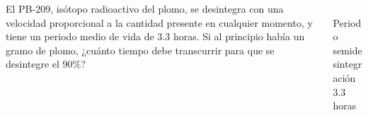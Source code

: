 \documentclass[aspectratio=149,10pt,xcolor=dvipsnames,t]{beamer}
\begin{document}
\begin{frame}
\begin{columns}
\begin{column}[T]{0.75\textwidth}
El PB-209, isótopo radioactivo del plomo, se desintegra con una velocidad proporcional a la cantidad presente en cualquier
momento, y tiene un periodo medio de vida de $3.3$ horas. 
Si al principio había un gramo de plomo, ¿cuánto tiempo debe transcurrir para que se desintegre el $90\%$?
\end{column}
\begin{column}[T]{0.25\textwidth}
\\
Periodo semidesintegración\\
$3.3$ horas
\end{column}
\end{columns}
\end{frame}
\end{document}
